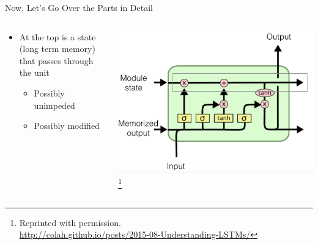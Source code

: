 \documentclass[aspectratio=169]{beamer}
\begin{document}
\begin{frame}{Now, Let's Go Over the Parts in Detail}

\begin{columns}
\begin{column}{0.5\textwidth}
        \begin{itemize}
	\item At the top is a state (long term memory) that passes through the unit
	\begin{itemize}
	\item Possibly unimpeded
	\item Possibly modified
	\end{itemize}
\end{itemize}
\end{column}
\begin{column}{0.5\textwidth}
\includegraphics[width=1\textwidth]{lectLSTM/highway.png}
\footnote{Reprinted with permission.\\ \hspace{1.7em}\url{http://colah.github.io/posts/2015-08-Understanding-LSTMs/}}
\end{column}
\end{columns}
\end{frame}
\end{document}
